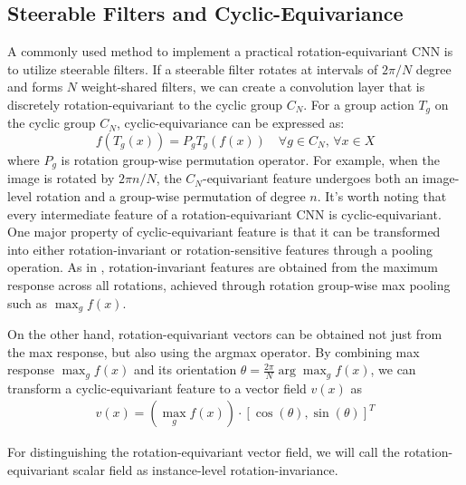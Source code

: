 \documentclass[letterpaper]{article} %
\begin{document}
\subsection{Steerable Filters and Cyclic-Equivariance} %
A commonly used method to implement a practical rotation-equivariant CNN is to utilize steerable filters. If a steerable filter rotates at intervals of \(2\pi/N\) degree and forms \(N\) weight-shared filters, we can create a convolution layer that is discretely rotation-equivariant to the cyclic group \(C_N\). For a group action \(T_g\) on the cyclic group \(C_N\), cyclic-equivariance can be expressed as:
\begin{equation}
     f\left(T_g(x)\right) = P_g T_g\left(f(x)\right)  \quad \forall g \in C_N ,\, \forall x \in X
\end{equation}
where \(P_g\) is rotation group-wise permutation operator. For example, when the image is rotated by \(2\pi n/N\), the \(C_N\)-equivariant feature undergoes both an image-level rotation and a group-wise permutation of degree \(n\). It's worth noting that every intermediate feature of a rotation-equivariant CNN is cyclic-equivariant. One major property of cyclic-equivariant feature is that it can be transformed into either rotation-invariant or rotation-sensitive features through a pooling operation. As in \citet{weiler2019general}, rotation-invariant features are obtained from the maximum response across all rotations, achieved through rotation group-wise max pooling such as \(\max_g f(x)\).

On the other hand, rotation-equivariant vectors can be obtained not just from the max response, but also using the argmax operator. By combining max response \(\max_g f(x)\) and its orientation \(\theta=\frac{2\pi}{N} \arg\max_g f(x)\), we can transform a cyclic-equivariant feature to a vector field \(v(x)\) as
\begin{align}
     v(x) = \left(\max_g f(x)\right) \cdot \left[\cos(\theta), \sin(\theta)\right]^T
     \label{eq:vec}
\end{align}

For distinguishing the rotation-equivariant vector field, we will call the rotation-equivariant scalar field as instance-level rotation-invariance.
\end{document}
